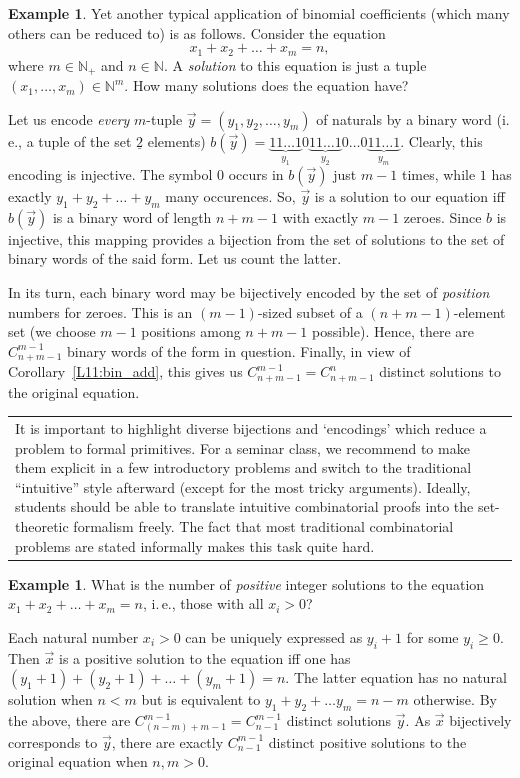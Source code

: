 \documentclass[12pt,notitlepage]{article}
\theoremstyle{plain}
\theoremstyle{definition}
\newtheorem{exm}[thm]{Example}
\theoremstyle{plain}
\newcommand{\N}{\mathbb{N}}
\newcommand{\ul}[1]{\underline{#1}}
\newcommand{\1}{\mathbf{1}}
\newcommand{\0}{\mathbf{0}}
\newcommand{\mcomm}[1]{
\medskip\noindent\begin{tabular}{| l}
\parbox{0.99\textwidth}{{\small
#1 }}\end{tabular}
\smallskip}
\begin{document}
\begin{exm}
Yet another typical application of binomial coefficients (which many others can be reduced to) is as follows. Consider the equation
$$x_1 + x_2 + \ldots + x_m = n,$$
where $m \in \N_+$ and $n \in \N$. A \emph{solution} to this equation is just a tuple $(x_1,\ldots, x_m) \in \N^m$. How many solutions does the equation have?

Let us encode \emph{every} $m$-tuple $\vec y = (y_1, y_2, \ldots,y_m)$ of naturals by a binary word (i.\,e., a tuple of the set $\ul{2}$ elements) $b(\vec y) = \underbrace{11\ldots1}_{y_1}0\underbrace{11\ldots1}_{y_2}0\ldots 0 \underbrace{11\ldots1}_{y_m}$. Clearly, this encoding is injective. The symbol $0$ occurs in $b(\vec y)$ just $m - 1$ times, while $1$ has exactly $y_1 + y_2 + \ldots + y_m$ many occurences. So, $\vec y$ is a solution to our equation iff $b(\vec y)$ is a binary word of length $n + m - 1$ with exactly $m - 1$ zeroes. Since $b$ is injective, this mapping provides a bijection from the set of solutions to the set of binary words of the said form. Let us count the latter.

In its turn, each binary word may be bijectively encoded by the set of \emph{position} numbers for zeroes. This is an $(m-1)$-sized subset of a $(n + m - 1)$-element set (we choose $m-1$ positions among $n + m -1$ possible). Hence, there are $C_{n + m -1}^{m - 1}$ binary words of the form in question. Finally, in view of Corollary~\ref{L11:bin_add}, this gives us $C_{n + m -1}^{m - 1} = C_{n + m -1}^{n}$ distinct solutions to the original equation.
\end{exm}
\mcomm{It is important to highlight diverse bijections and `encodings' which reduce a problem to formal primitives. For a seminar class, we recommend to make them explicit in a few introductory problems and switch to the traditional ``intuitive'' style afterward (except for the most tricky arguments). Ideally, students should be able to translate intuitive combinatorial proofs into the set-theoretic formalism freely. The fact that most traditional combinatorial problems are stated informally makes this task quite hard.}
\begin{exm}
What is the number of \emph{positive} integer solutions to the equation $x_1 + x_2 + \ldots + x_m = n$, i.\,e., those with all $x_i > 0$?

Each natural number $x_i > 0$ can be uniquely expressed as $y_i + 1$ for some $y_i \geq 0$. Then $\vec x$ is a positive solution to the equation iff one has $(y_1 + 1) + (y_2 + 1) + \ldots + (y_m + 1) = n$. The latter equation has no natural solution when $n < m$ but is equivalent to $y_1 + y_2 + \ldots y_m = n - m$ otherwise. By the above, there are $C_{(n - m) + m - 1}^{m - 1} = C_{n - 1}^{m - 1}$ distinct solutions $\vec y$. As $\vec x$ bijectively corresponds to $\vec y$, there are exactly $C_{n - 1}^{m - 1}$ distinct positive solutions to the original equation when $n, m > 0$.
\end{exm}
\end{document}
